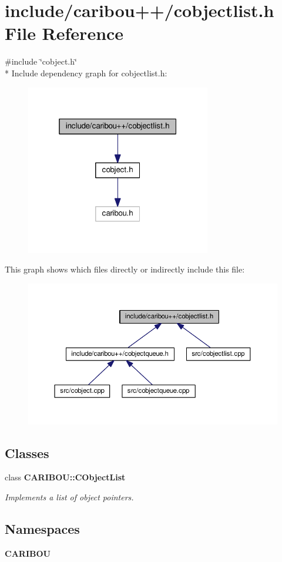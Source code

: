 \section{include/caribou++/cobjectlist.h File Reference}
\label{cobjectlist_8h}
{\ttfamily \#include \char`\"{}cobject.\+h\char`\"{}}\\*
Include dependency graph for cobjectlist.\+h\+:
\nopagebreak
\begin{figure}[H]
\begin{center}
\leavevmode
\includegraphics[width=229pt]{cobjectlist_8h__incl}
\end{center}
\end{figure}
This graph shows which files directly or indirectly include this file\+:
\nopagebreak
\begin{figure}[H]
\begin{center}
\leavevmode
\includegraphics[width=350pt]{cobjectlist_8h__dep__incl}
\end{center}
\end{figure}
\subsection*{Classes}
\begin{DoxyCompactItemize}
\item 
class {\bf C\+A\+R\+I\+B\+O\+U\+::\+C\+Object\+List}
\begin{DoxyCompactList}\small\item\em Implements a list of object pointers. \end{DoxyCompactList}\end{DoxyCompactItemize}
\subsection*{Namespaces}
\begin{DoxyCompactItemize}
\item 
 {\bf C\+A\+R\+I\+B\+OU}
\end{DoxyCompactItemize}
